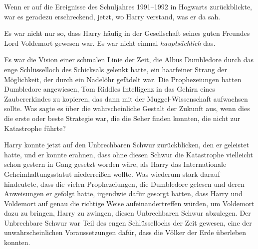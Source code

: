 Wenn er auf die Ereignisse des Schuljahres 1991–1992 in Hogwarts zurückblickte, war es geradezu erschreckend, jetzt, wo Harry verstand, was er da sah.

Es war nicht nur so, dass Harry häufig in der Gesellschaft seines guten Freundes Lord Voldemort gewesen war. Es war nicht einmal \emph{hauptsächlich} das.

Es war die Vision einer schmalen Linie der Zeit, die Albus Dumbledore durch das enge Schlüsselloch des Schicksals gelenkt hatte, ein haarfeiner Strang der Möglichkeit, der durch ein Nadelöhr gefädelt war.
Die Prophezeiungen hatten Dumbledore angewiesen, Tom Riddles Intelligenz in das Gehirn eines Zaubererkindes zu kopieren, das dann mit der Muggel-Wissenschaft aufwachsen sollte. Was sagte es über die wahrscheinliche Gestalt der Zukunft aus, wenn dies die erste oder beste Strategie war, die die Seher finden konnten, die nicht zur Katastrophe führte?

Harry konnte jetzt auf den Unbrechbaren Schwur zurückblicken, den er geleistet hatte, und er konnte erahnen, dass ohne diesen Schwur die Katastrophe vielleicht schon gestern in Gang gesetzt worden wäre, als Harry das Internationale Geheimhaltungsstatut niederreißen wollte. Was wiederum stark darauf hindeutete, dass die vielen Prophezeiungen, die Dumbledore gelesen und deren Anweisungen er gefolgt hatte, irgendwie dafür gesorgt hatten, dass Harry und Voldemort auf genau die richtige Weise aufeinandertreffen würden, um Voldemort dazu zu bringen, Harry zu zwingen, diesen Unbrechbaren Schwur abzulegen. Der Unbrechbare Schwur war Teil des engen Schlüssellochs der Zeit gewesen, eine der unwahrscheinlichen Voraussetzungen dafür, dass die Völker der Erde überleben konnten.

